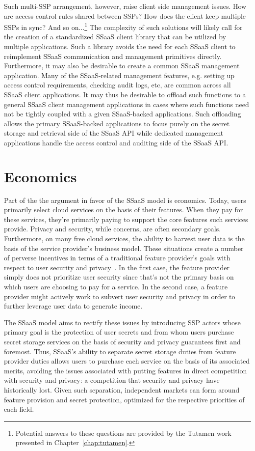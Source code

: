 Such multi-SSP arrangement, however, raise client side management
issues. How are access control rules shared between SSPs? How does the
client keep multiple SSPs in sync? And so on...\footnote{Potential
  answers to these questions are provided by the Tutamen work
  presented in Chapter~\ref{chap:tutamen}.} The complexity of such
solutions will likely call for the creation of a standardized SSaaS
client library that can be utilized by multiple applications. Such a
library avoids the need for each SSaaS client to reimplement SSaaS
communication and management primitives directly. Furthermore, it may
also be desirable to create a common SSaaS management
application. Many of the SSaaS-related management features,
e.g. setting up access control requirements, checking audit logs, etc,
are common across all SSaaS client applications. It may thus be
desirable to offload such functions to a general SSaaS client
management applications in cases where such functions need not be
tightly coupled with a given SSaaS-backed applications. Such
offloading allows the primary SSaaS-backed applications to focus
purely on the secret storage and retrieval side of the SSaaS API while
dedicated management applications handle the access control and
auditing side of the SSaaS API.

\section{Economics}
\label{chap:ssaas:economics}

Part of the the argument in favor of the SSaaS model is
economics. Today, users primarily select cloud services on the basis
of their features. When they pay for these services, they're primarily
paying to support the core features such services provide. Privacy and
security, while concerns, are often secondary goals. Furthermore, on
many free cloud services, the ability to harvest user data is the
basis of the service provider's business model. These situations
create a number of perverse incentives in terms of a traditional
feature provider's goals with respect to user security and
privacy~\cite{anderson2001}. In the first case, the feature provider
simply does not prioritize user security since that's not the primary
basis on which users are choosing to pay for a service. In the second
case, a feature provider might actively work to subvert user security
and privacy in order to further leverage user data to generate income.

The SSaaS model aims to rectify these issues by introducing SSP actors
whose primary goal is the protection of user secrets and from whom
users purchase secret storage services on the basis of security and
privacy guarantees first and foremost. Thus, SSaaS's ability to
separate secret storage duties from feature provider duties allows
users to purchase each service on the basis of its associated merits,
avoiding the issues associated with putting features in direct
competition with security and privacy: a competition that security and
privacy have historically lost. Given such separation, independent
markets can form around feature provision and secret protection,
optimized for the respective priorities of each field.

